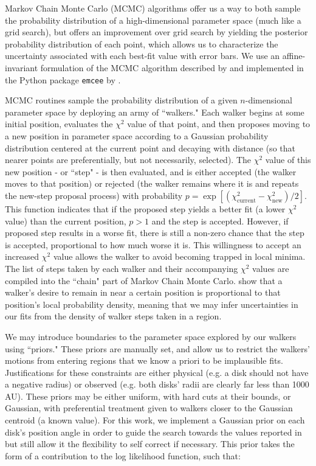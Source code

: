 Markov Chain Monte Carlo (MCMC) algorithms offer us a way to both sample the probability distribution of a high-dimensional parameter space (much like a grid search), but offers an improvement over grid search by yielding the posterior probability distribution of each point, which allows us to characterize the uncertainty associated with each best-fit value with error bars. We use an affine-invariant formulation of the MCMC algorithm described by \citet{Goodman2010} and implemented in the Python package \texttt{emcee} by \citet{ForemanMackey2013}.

MCMC routines sample the probability distribution of a given $n$-dimensional parameter space by deploying an army of ``walkers." Each walker begins at some initial position, evaluates the $\chi^2$ value of that point, and then proposes moving to a new position in parameter space according to a Gaussian probability distribution centered at the current point and decaying with distance (so that nearer points are preferentially, but not necessarily, selected). The $\chi^2$ value of this new position - or ``step" - is then evaluated, and is either accepted (the walker moves to that position) or rejected (the walker remains where it is and repeats the new-step proposal process) with probability $p = \exp \left[ (\chi_\text{current}^2 - \chi_\text{new}^2)/2 \right]$. This function indicates that if the proposed step yields a better fit (a lower $\chi^2$ value) than the current position, $p > 1$ and the step is accepted. However, if proposed step results in a worse fit, there is still a non-zero chance that the step is accepted, proportional to how much worse it is. This willingness to accept an increased $\chi^2$ value allows the walker to avoid becoming trapped in local minima. The list of steps taken by each walker and their accompanying $\chi^2$ values are compiled into the ``chain" part of Markov Chain Monte Carlo. \citet{Goodman2010} show that a walker's desire to remain in near a certain position is proportional to that position's local probability density, meaning that we may infer uncertainties in our fits from the density of walker steps taken in a region.

We may introduce boundaries to the parameter space explored by our walkers using ``priors." These priors are manually set, and allow us to restrict the walkers' motions from entering regions that we know a priori to be implausible fits. Justifications for these constraints are either physical (e.g. a disk should not have a negative radius) or observed (e.g. both disks' radii are clearly far less than 1000 AU). These priors may be either uniform, with hard cuts at their bounds, or Gaussian, with preferential treatment given to walkers closer to the Gaussian centroid (a known value). For this work, we implement a Gaussian prior on each disk's position angle in order to guide the search towards the values reported in \citet{Williams2014} but still allow it the flexibility to self correct if necessary. This prior takes the form of a contribution to the log likelihood function, such that:

